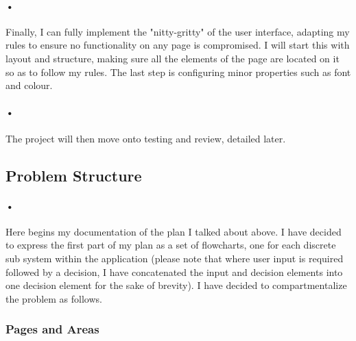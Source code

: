 ﻿\documentclass{article}
\begin{document}
    \paragraph{•}
    Finally, I can fully implement the "nitty-gritty" of the user interface, adapting my rules to ensure no functionality on any page is compromised.
    I will start this with layout and structure, making sure all the elements of the page are located on it so as to follow my rules.
    The last step is configuring minor properties such as font and colour.
    \paragraph{•}
    The project will then move onto testing and review, detailed later.
    
    \subsection{Problem Structure}
    \paragraph{•}
    Here begins my documentation of the plan I talked about above.
    I have decided to express the first part of my plan as a set of flowcharts, one for each discrete sub system within the application (please note that where user input is required followed by a decision, I have concatenated the input and decision elements into one decision element for the sake of brevity).
    I have decided to compartmentalize the problem as follows.
    \subsubsection{Pages and Areas}
\end{document}
